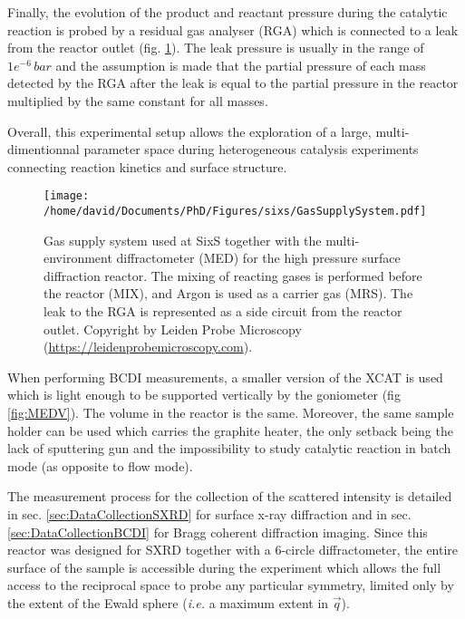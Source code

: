 Finally, the evolution of the product and reactant pressure during the catalytic reaction is probed by a residual gas analyser (RGA) which is connected to a leak from the reactor outlet (fig. \ref{fig:GasSupplySystem}).
The leak pressure is usually in the range of $1e^{-6} \, \si{bar}$ and the assumption is made that the partial pressure of each mass detected by the RGA after the leak is equal to the partial pressure in the reactor multiplied by the same constant for all masses.

Overall, this experimental setup allows the exploration of a large, multi-dimentionnal parameter space during heterogeneous catalysis experiments connecting reaction kinetics and surface structure.

\begin{figure}[!htb]
    \centering
    \texttt{[image: /home/david/Documents/PhD/Figures/sixs/GasSupplySystem.pdf]}
    \caption{
    	Gas supply system used at SixS together with the multi-environment diffractometer (MED) for the high pressure surface diffraction reactor.
    	The mixing of reacting gases is performed before the reactor (MIX), and Argon is used as a carrier gas (MRS).
    	The leak to the RGA is represented as a side circuit from the reactor outlet.
    	Copyright by Leiden Probe Microscopy (\url{https://leidenprobemicroscopy.com}).
    }
    \label{fig:GasSupplySystem}
\end{figure}

When performing BCDI measurements, a smaller version of the XCAT is used which is light enough to be supported vertically by the goniometer (fig \ref{fig:MEDV}).
The volume in the reactor is the same.
Moreover, the same sample holder can be used which carries the graphite heater, the only setback being the lack of sputtering gun and the impossibility to study catalytic reaction in batch mode (as opposite to flow mode).

The measurement process for the collection of the scattered intensity is detailed in sec. \ref{sec:DataCollectionSXRD} for surface x-ray diffraction and in sec. \ref{sec:DataCollectionBCDI} for Bragg coherent diffraction imaging.
Since this reactor was designed for SXRD together with a 6-circle diffractometer, the entire surface of the sample is accessible during the experiment which allows the full access to the reciprocal space to probe any particular symmetry, limited only by the extent of the Ewald sphere (\textit{i.e.} a maximum extent in $\vec{q}$).

